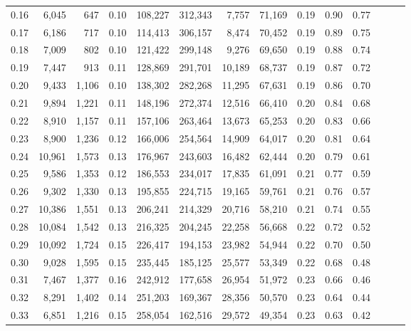 \begin{tabular}{rrrrrrrrrrrrrr}
0.16 &   6,045 &    647 &  0.10 &  108,227 &  312,343 &   7,757 &  71,169 &  0.19 &  0.90 &      0.77 \\
0.17 &   6,186 &    717 &  0.10 &  114,413 &  306,157 &   8,474 &  70,452 &  0.19 &  0.89 &      0.75 \\
0.18 &   7,009 &    802 &  0.10 &  121,422 &  299,148 &   9,276 &  69,650 &  0.19 &  0.88 &      0.74 \\
0.19 &   7,447 &    913 &  0.11 &  128,869 &  291,701 &  10,189 &  68,737 &  0.19 &  0.87 &      0.72 \\
0.20 &   9,433 &  1,106 &  0.10 &  138,302 &  282,268 &  11,295 &  67,631 &  0.19 &  0.86 &      0.70 \\
0.21 &   9,894 &  1,221 &  0.11 &  148,196 &  272,374 &  12,516 &  66,410 &  0.20 &  0.84 &      0.68 \\
0.22 &   8,910 &  1,157 &  0.11 &  157,106 &  263,464 &  13,673 &  65,253 &  0.20 &  0.83 &      0.66 \\
0.23 &   8,900 &  1,236 &  0.12 &  166,006 &  254,564 &  14,909 &  64,017 &  0.20 &  0.81 &      0.64 \\
0.24 &  10,961 &  1,573 &  0.13 &  176,967 &  243,603 &  16,482 &  62,444 &  0.20 &  0.79 &      0.61 \\
0.25 &   9,586 &  1,353 &  0.12 &  186,553 &  234,017 &  17,835 &  61,091 &  0.21 &  0.77 &      0.59 \\
0.26 &   9,302 &  1,330 &  0.13 &  195,855 &  224,715 &  19,165 &  59,761 &  0.21 &  0.76 &      0.57 \\
0.27 &  10,386 &  1,551 &  0.13 &  206,241 &  214,329 &  20,716 &  58,210 &  0.21 &  0.74 &      0.55 \\
0.28 &  10,084 &  1,542 &  0.13 &  216,325 &  204,245 &  22,258 &  56,668 &  0.22 &  0.72 &      0.52 \\
0.29 &  10,092 &  1,724 &  0.15 &  226,417 &  194,153 &  23,982 &  54,944 &  0.22 &  0.70 &      0.50 \\
0.30 &   9,028 &  1,595 &  0.15 &  235,445 &  185,125 &  25,577 &  53,349 &  0.22 &  0.68 &      0.48 \\
0.31 &   7,467 &  1,377 &  0.16 &  242,912 &  177,658 &  26,954 &  51,972 &  0.23 &  0.66 &      0.46 \\
0.32 &   8,291 &  1,402 &  0.14 &  251,203 &  169,367 &  28,356 &  50,570 &  0.23 &  0.64 &      0.44 \\
0.33 &   6,851 &  1,216 &  0.15 &  258,054 &  162,516 &  29,572 &  49,354 &  0.23 &  0.63 &      0.42 \\

\end{tabular}
